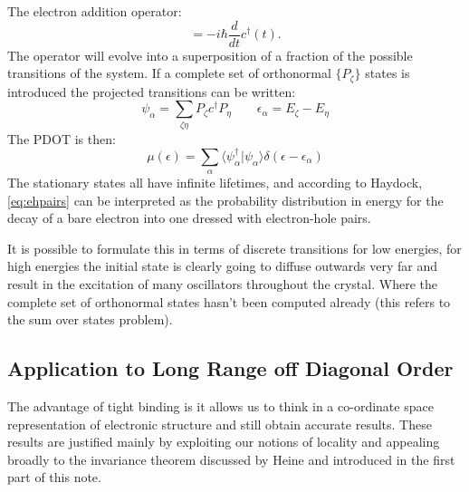 \documentclass{article}
\def\ket{\rangle}
\def\bra{\langle}
\begin{document}
The electron addition operator:
%
\begin{equation}
[H, c^{\dagger}(t)] = -i\hbar \frac{d}{dt} c^{\dagger}(t).
\end{equation}
%
The operator will evolve into a superposition of a fraction of the 
possible transitions of the system. If a complete set of orthonormal $\{P_{\zeta}\}$ 
states is introduced the projected transitions can be written:
%
\begin{equation}
\psi_{\alpha} = \sum_{\zeta\eta} P_{\zeta}c^{\dagger}P_{\eta} \qquad \epsilon_{\alpha} = E_{\zeta} - E_{\eta}
\end{equation}
%
The PDOT is then:
%
\begin{equation}
\mu(\epsilon) = \sum_{\alpha} \bra\psi_{\alpha}^{\dagger}|\psi_{\alpha}\ket \delta(\epsilon-\epsilon_{\alpha})
\end{equation}
%
The stationary states all have infinite lifetimes, and according to Haydock, \ref{eq:ehpairs} can
be interpreted as the probability distribution in energy for the decay of a bare electron into one dressed
with electron-hole pairs.

It is possible to formulate this in terms of discrete transitions for low energies, for high energies
the initial state is clearly going to diffuse outwards very far and result in the excitation of 
many oscillators throughout the crystal. Where the complete set of orthonormal states
hasn't been computed already (this refers to the sum over states problem).

\subsection{Application to Long Range off Diagonal Order}
The advantage of tight binding is it allows us to think in a co-ordinate space representation
of electronic structure and still obtain accurate results. These results are justified mainly 
by exploiting our notions of locality and appealing broadly to the invariance theorem discussed by Heine and introduced
in the first part of this note. 
\end{document}
